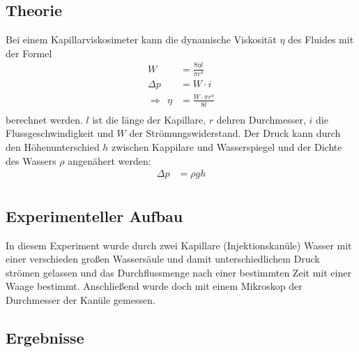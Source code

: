 \documentclass[11pt, a4paper]{article}
\begin{document}
    \subsection{Theorie}

    Bei einem Kapillarviskosimeter kann die dynamische Viskosität $\eta$ des Fluides mit der Formel
    \begin{align}
        W &= \frac{8 \eta l}{\pi r^4} \\
        \Delta p &= W \cdot i \\
        \Rightarrow \ \ \eta &= \frac{W \cdot \pi r^4}{8 l} \\
    \end{align}
    berechnet werden. $l$ ist die länge der Kapillare, $r$ dehren Durchmesser, $i$ die Flussgeschwindigkeit und $W$ der
    Strömungswiderstand. Der Druck kann durch den Höhenunterschied $h$ zwischen Kappilare und Wasserspiegel und der Dichte des Wassers $\rho$ angenähert werden:
    \begin{align}
        \Delta p &= \rho g h \\
    \end{align}

    \subsection{Experimenteller Aufbau}

    In diesem Experiment wurde durch zwei Kapillare (Injektionskanüle)
    Wasser mit einer verschieden großen Wassersäule und damit unterschiedlichem Druck strömen gelassen
    und das Durchflussmenge nach einer bestimmten Zeit mit einer Waage bestimmt. Anschließend wurde doch mit einem
    Mikroskop der Durchmesser der Kanüle gemessen.

    \subsection{Ergebnisse}
\end{document}

